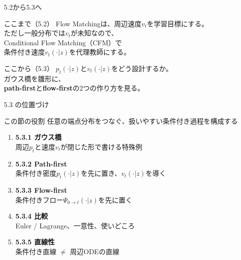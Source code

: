 

\begin{frame}{5.2から5.3へ}
    \begin{block}{ここまで（5.2）}
        Flow Matchingは、周辺速度$v_t$を学習目標にする。\\
        ただし一般分布では$v_t$が未知なので、\\
        Conditional Flow Matching（CFM）で\\
        条件付き速度$v_t(\cdot|z)$を代理教師にする。
    \end{block}
    \begin{block}{ここから（5.3）}
        $p_t(\cdot|z)$と$v_t(\cdot|z)$をどう設計するか。\\
        ガウス橋を雛形に、\\
        \textbf{path-first}と\textbf{flow-first}の2つの作り方を見る。
    \end{block}
\end{frame}
\asmain
\begin{frame}{5.3 の位置づけ}
    \begin{block}{この節の役割}
        任意の端点分布をつなぐ、扱いやすい条件付き過程を構成する
    \end{block}
    \begin{enumerate}
        \item \textbf{5.3.1 ガウス橋}\\
        周辺$p_t$と速度$v_t$が閉じた形で書ける特殊例
        \item \textbf{5.3.2 Path-first}\\
        条件付き密度$p_t(\cdot|z)$を先に置き、$v_t(\cdot|z)$を導く
        \item \textbf{5.3.3 Flow-first}\\
        条件付きフロー$\Psi_{0\to t}(\cdot|z)$を先に置く
        \item \textbf{5.3.4 比較}\\
        Euler / Lagrange、一意性、使いどころ
        \item \textbf{5.3.5 直線性}\\
        条件付き直線 $\neq$ 周辺ODEの直線
    \end{enumerate}
\end{frame}
